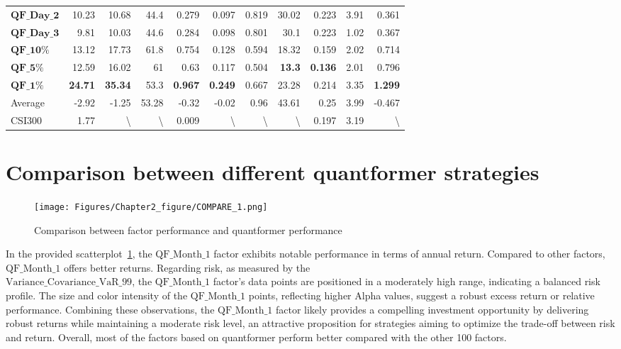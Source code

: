 \documentclass[preprint,12pt]{elsarticle}
\begin{document}
{\begin{longtable}{lrrrrrrrrrr}
   $\textbf{QF\_Day\_2}$ &   10.23 &  10.68  & 44.4   & 0.279    &  0.097 & 0.819 & 30.02  & 0.223  & 3.91 & 0.361 \\
   $\textbf{QF\_Day\_3}$ &  9.81  &  10.03     &  44.6  &  0.284     & 0.098  & 0.801 & 30.1  &  0.223 & 1.02 & 0.367 \\
   $\textbf{QF\_10\%}$ &  13.12  &  17.73    & 61.8   & 0.754     & 0.128  & 0.594 & 18.32  & 0.159  & 2.02 & 0.714 \\
    $\textbf{QF\_5\%}$ &  12.59  &  16.02 &  61  &  0.63     & 0.117  & 0.504 & \textbf{13.3}  & \textbf{0.136}  & 2.01 &  0.796\\
    $\textbf{QF\_1\%}$ &  \textbf{24.71}  &  \textbf{35.34}     &  53.3  &  \textbf{0.967}     & \textbf{0.249}  & 0.667 & 23.28  & 0.214  & 3.35 & \textbf{1.299} \\
    Average	& -2.92 & -1.25	& 53.28	& -0.32	& -0.02	& 0.96	& 43.61	& 0.25 & 3.99 & -0.467 \\
    CSI300 &  1.77 & \textbackslash & \textbackslash & 0.009 & \textbackslash & \textbackslash &  \textbackslash & 0.197 & 3.19 & \textbackslash \\
\end{longtable}
}

\section{Comparison between different quantformer strategies}
\begin{figure}[ht]
\centerline{\texttt{[image: Figures/Chapter2\_figure/COMPARE\_1.png]}}
\renewcommand{\figurename}{Figure}
\caption{Comparison between factor performance and quantformer performance}
\label{scatter}
\end{figure}

In the provided scatterplot~\ref{scatter}, the $\mathrm{QF\_Month\_1}$ factor exhibits notable performance in terms of annual return. Compared to other factors, $\mathrm{QF\_Month\_1}$ offers better returns. Regarding risk, as measured by the \\ 
$\mathrm{Variance\_Covariance\_VaR\_99}$, the $\mathrm{QF\_Month\_1}$ factor's data points are positioned in a moderately high range, indicating a balanced risk profile. The size and color intensity of the $\mathrm{QF\_Month\_1}$ points, reflecting higher Alpha values, suggest a robust excess return or relative performance. Combining these observations, the $\mathrm{QF\_Month\_1}$ factor likely provides a compelling investment opportunity by delivering robust returns while maintaining a moderate risk level, an attractive proposition for strategies aiming to optimize the trade-off between risk and return. Overall, most of the factors based on quantformer perform better compared with the other 100 factors. 
\end{document}
